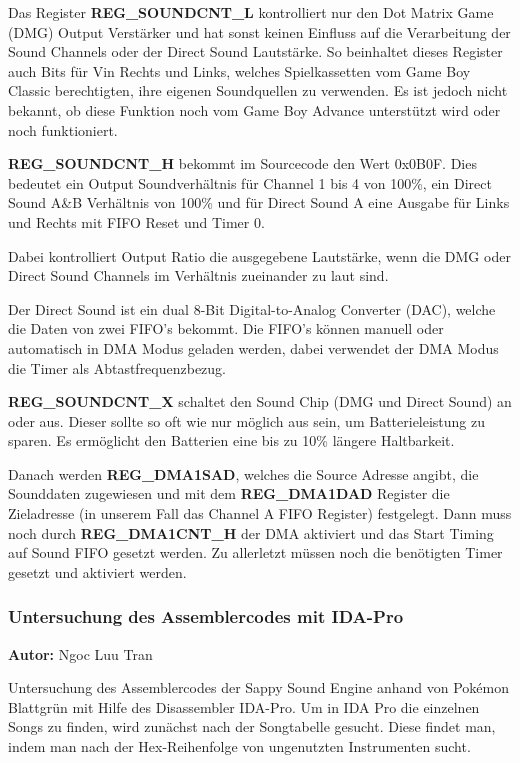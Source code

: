 \documentclass[11pt,a4paper]{scrartcl}
\newcommand{\AutorNgoc} {
    \vspace{-4mm}
    \large \textbf{Autor:} Ngoc Luu Tran \normalsize
    \vspace{2mm}
}
\begin{document}
Das Register \textbf{REG\_SOUNDCNT\_L} kontrolliert nur den Dot Matrix Game (DMG) Output Verst\"arker und hat sonst keinen Einfluss auf die Verarbeitung der Sound Channels oder der Direct Sound Lautst\"arke. So beinhaltet dieses Register auch Bits f\"ur Vin Rechts und Links, welches Spielkassetten vom Game Boy Classic berechtigten, ihre eigenen Soundquellen zu verwenden. Es ist jedoch nicht bekannt, ob diese Funktion noch vom Game Boy Advance unterst\"utzt wird oder noch funktioniert.

\textbf{REG\_SOUNDCNT\_H} bekommt im Sourcecode den Wert 0x0B0F. Dies bedeutet ein Output Soundverh\"altnis f\"ur Channel 1 bis 4 von 100\%, ein Direct Sound A\&B Verh\"altnis von 100\% und f\"ur Direct Sound A eine Ausgabe f\"ur Links und Rechts mit FIFO Reset und Timer 0.

Dabei kontrolliert Output Ratio die ausgegebene Lautst\"arke, wenn die DMG oder Direct Sound Channels im Verh\"altnis zueinander zu laut sind.

Der Direct Sound ist ein dual 8-Bit Digital-to-Analog Converter (DAC), welche die Daten von zwei FIFO's bekommt. Die FIFO's k\"onnen manuell oder automatisch in DMA Modus geladen werden, dabei verwendet der DMA Modus die Timer als Abtastfrequenzbezug.

\textbf{REG\_SOUNDCNT\_X} schaltet den Sound Chip (DMG und Direct Sound) an oder aus. Dieser sollte so oft wie nur m\"oglich aus sein, um Batterieleistung zu sparen. Es erm\"oglicht den Batterien eine bis zu 10\% l\"angere Haltbarkeit. 

Danach werden \textbf{REG\_DMA1SAD}, welches die Source Adresse angibt, die Sounddaten zugewiesen und mit dem \textbf{REG\_DMA1DAD} Register die Zieladresse (in unserem Fall das Channel A FIFO Register) festgelegt. Dann muss noch durch \textbf{REG\_DMA1CNT\_H} der DMA aktiviert und das Start Timing auf Sound FIFO gesetzt werden. Zu allerletzt m\"ussen noch die ben\"otigten Timer gesetzt und aktiviert werden.



\subsubsection{Untersuchung des Assemblercodes mit IDA-Pro} \label{Assemblercode}
\AutorNgoc

Untersuchung des Assemblercodes der Sappy Sound Engine anhand von Pok\'{e}mon Blattgr\"un mit Hilfe des Disassembler IDA-Pro.\newline
Um in IDA Pro die einzelnen Songs zu finden, wird zun\"achst nach der Songtabelle gesucht. Diese findet man, indem man nach der Hex-Reihenfolge von ungenutzten Instrumenten sucht.
\end{document}

